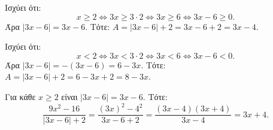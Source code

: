 
\begin{alist}
\item
\begin{rlist}
\item Ισχύει ότι:
\[x \ge 2 \Leftrightarrow 3x \ge 3 \cdot 2 \Leftrightarrow 3x \ge 6 \Leftrightarrow 3x - 6 \ge 0.\]
Άρα $|3x - 6| = 3x - 6$.
Τότε:
$A = |3x - 6| + 2 = 3x - 6 + 2 = 3x - 4$.

\item Ισχύει ότι:
\[x < 2 \Leftrightarrow 3x < 3 \cdot 2 \Leftrightarrow 3x < 6 \Leftrightarrow 3x - 6 < 0.\]
Άρα $|3x - 6| = -(3x - 6) = 6 - 3x$.
Τότε:
$A = |3x - 6| + 2 = 6 - 3x + 2 = 8 - 3x$.
\end{rlist}

\item Για κάθε $x \ge 2$ είναι $|3x - 6| = 3x - 6$. Τότε:
\[\dfrac{9x^2 - 16}{|3x - 6| + 2} = \dfrac{(3x)^2 - 4^2}{3x - 6 + 2} = \dfrac{(3x - 4)(3x + 4)}{3x - 4} = 3x + 4.\]
\end{alist}

